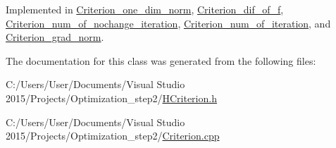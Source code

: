 Implemented in \hyperlink{class_criterion__one__dim__norm_a7270d8ca17d8f810b4a270ad604be8bd}{Criterion\+\_\+one\+\_\+dim\+\_\+norm}, \hyperlink{class_criterion__dif__of__f_a0bea2c48766a1db63ec9d3ba7cf08767}{Criterion\+\_\+dif\+\_\+of\+\_\+f}, \hyperlink{class_criterion__num__of__nochange__iteration_a7ced10cb8ce2f4979ae0d25287d91a40}{Criterion\+\_\+num\+\_\+of\+\_\+nochange\+\_\+iteration}, \hyperlink{class_criterion__num__of__iteration_a6566342d95827d9350485498c6c4eba6}{Criterion\+\_\+num\+\_\+of\+\_\+iteration}, and \hyperlink{class_criterion__grad__norm_ae95aa823069c1fcbcd333eacd00f78c9}{Criterion\+\_\+grad\+\_\+norm}.



The documentation for this class was generated from the following files\+:\begin{DoxyCompactItemize}
\item 
C\+:/\+Users/\+User/\+Documents/\+Visual Studio 2015/\+Projects/\+Optimization\+\_\+step2/\hyperlink{_h_criterion_8h}{H\+Criterion.\+h}\item 
C\+:/\+Users/\+User/\+Documents/\+Visual Studio 2015/\+Projects/\+Optimization\+\_\+step2/\hyperlink{_criterion_8cpp}{Criterion.\+cpp}\end{DoxyCompactItemize}
